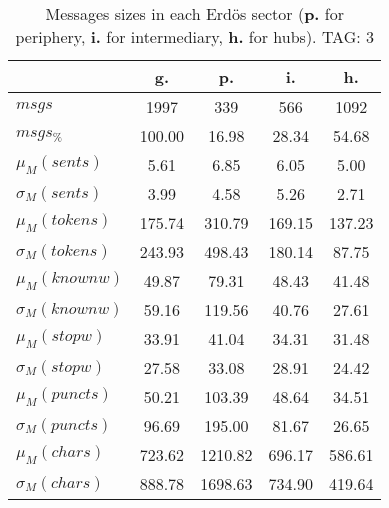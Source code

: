 \begin{table}[h!]
\begin{center}
\begin{tabular}{| l | c | c | c | c |}\hline
 & g. & p. & i. & h. \\\hline
$msgs$ & 1997  & 339  & 566  & 1092 \\\hline
$msgs_{\%}$ & 100.00  & 16.98  & 28.34  & 54.68 \\\hline
$\mu_M(sents)$ & 5.61  & 6.85  & 6.05  & 5.00 \\\hline
$\sigma_M(sents)$ & 3.99  & 4.58  & 5.26  & 2.71 \\\hline
$\mu_M(tokens)$ & 175.74  & 310.79  & 169.15  & 137.23 \\\hline
$\sigma_M(tokens)$ & 243.93  & 498.43  & 180.14  & 87.75 \\\hline
$\mu_M(knownw)$ & 49.87  & 79.31  & 48.43  & 41.48 \\\hline
$\sigma_M(knownw)$ & 59.16  & 119.56  & 40.76  & 27.61 \\\hline
$\mu_M(stopw)$ & 33.91  & 41.04  & 34.31  & 31.48 \\\hline
$\sigma_M(stopw)$ & 27.58  & 33.08  & 28.91  & 24.42 \\\hline
$\mu_M(puncts)$ & 50.21  & 103.39  & 48.64  & 34.51 \\\hline
$\sigma_M(puncts)$ & 96.69  & 195.00  & 81.67  & 26.65 \\\hline
$\mu_M(chars)$ & 723.62  & 1210.82  & 696.17  & 586.61 \\\hline
$\sigma_M(chars)$ & 888.78  & 1698.63  & 734.90  & 419.64 \\\hline
\end{tabular}
\caption{Messages sizes in each Erd\"os sector ({{\bf p.}} for periphery, {{\bf i.}} for intermediary, {{\bf h.}} for hubs). TAG: 3}
\end{center}
\end{table}